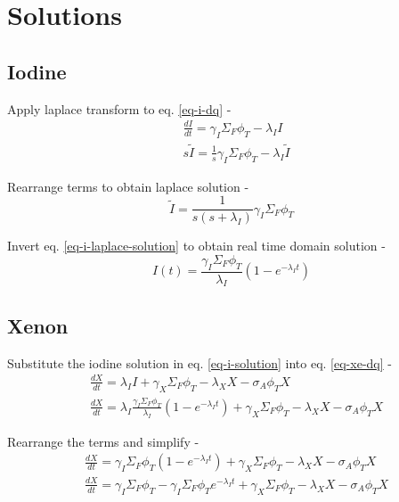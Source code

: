 \documentclass[11pt,a4paper]{article}
\begin{document}
\newpage

\section{Solutions}
\subsection{Iodine}
Apply laplace transform to eq. \ref{eq-i-dq} - 
\begin{equation} \label{eq-i-laplace-transform}
    \begin{split}
        & \frac{dI}{dt}=\gamma_I \Sigma_F \phi_T-\lambda_I I \\
        & s\tilde{I}=\frac{1}{s}\gamma_I\Sigma_F\phi_T-\lambda_I\tilde{I}
    \end{split}
\end{equation}
\vspace{\baselineskip}

Rearrange terms to obtain laplace solution - 
\begin{equation} \label{eq-i-laplace-solution}
    \tilde{I}=\frac{1}{s(s+\lambda_I)}\gamma_I\Sigma_F\phi_T
\end{equation}
\vspace{\baselineskip}

Invert eq. \ref{eq-i-laplace-solution} to obtain real time domain solution - 
\begin{equation} \label{eq-i-solution}
    I(t)=\frac{\gamma_I\Sigma_F\phi_T}{\lambda_I}(1-e^{-\lambda_I t})
\end{equation}

\subsection{Xenon}
Substitute the iodine solution in eq. \ref{eq-i-solution} into eq. \ref{eq-xe-dq} - 
\begin{equation} 
    \begin{split}
        & \frac{dX}{dt}=\lambda_I I + \gamma_X \Sigma_F \phi_T - \lambda_X X - \sigma_A \phi_T X \\
        & \frac{dX}{dt}=\lambda_I \frac{\gamma_I\Sigma_F\phi_T}{\lambda_I}(1-e^{-\lambda_I t}) + \gamma_X \Sigma_F \phi_T - \lambda_X X - \sigma_A \phi_T X
    \end{split}
\end{equation}
\vspace{\baselineskip}

Rearrange the terms and simplify - 
\begin{equation} 
    \begin{split}
        & \frac{dX}{dt}=\gamma_I\Sigma_F\phi_T(1-e^{-\lambda_I t}) + \gamma_X \Sigma_F \phi_T - \lambda_X X - \sigma_A \phi_T X \\
        & \frac{dX}{dt}=\gamma_I\Sigma_F\phi_T - \gamma_I\Sigma_F\phi_T e^{-\lambda_I t} + \gamma_X \Sigma_F \phi_T - \lambda_X X - \sigma_A \phi_T X 
    \end{split}
\end{equation}
\vspace{\baselineskip}
\end{document}
